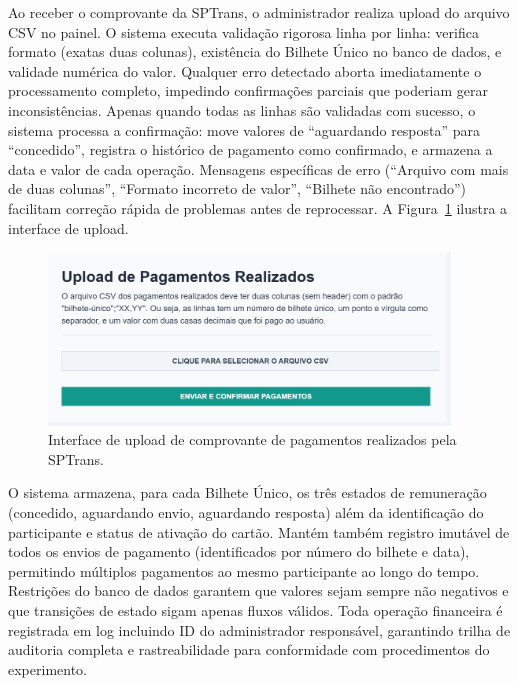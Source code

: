 Ao receber o comprovante da SPTrans,
o administrador realiza upload do arquivo CSV no painel. O sistema executa validação
rigorosa linha por linha: verifica formato (exatas duas colunas), existência do
Bilhete Único no banco de dados, e validade numérica do valor. Qualquer erro
detectado aborta imediatamente o processamento completo, impedindo confirmações
parciais que poderiam gerar inconsistências. Apenas quando todas as linhas são
validadas com sucesso, o sistema processa a confirmação: move valores de
``aguardando resposta'' para ``concedido'', registra o histórico de pagamento como confirmado, e armazena a data e valor de cada operação. Mensagens específicas de erro (``Arquivo com
mais de duas colunas'', ``Formato incorreto de valor'', ``Bilhete não encontrado'')
facilitam correção rápida de problemas antes de reprocessar. A Figura~\ref{fig:remuneracao_gerar_csv_form_processados} ilustra a interface de upload.

\begin{figure}[H]
    \centering
    \includegraphics[width=0.95\textwidth]{figuras/remuneracao_processados.png}
    \caption{Interface de upload de comprovante de pagamentos realizados pela SPTrans.}
    \label{fig:remuneracao_gerar_csv_form_processados}
  \end{figure}
O sistema armazena, para cada Bilhete Único, os três estados de remuneração (concedido, aguardando envio, aguardando resposta) além da identificação do participante e status de ativação do cartão. Mantém também registro imutável de todos os envios de pagamento (identificados por número do bilhete e data), permitindo múltiplos pagamentos ao mesmo participante ao longo do tempo. Restrições do banco de dados garantem que valores sejam sempre não
negativos e que transições de estado sigam apenas fluxos
válidos. Toda operação financeira é registrada em log incluindo ID do administrador
responsável, garantindo trilha de auditoria completa e rastreabilidade para
conformidade com procedimentos do experimento.

